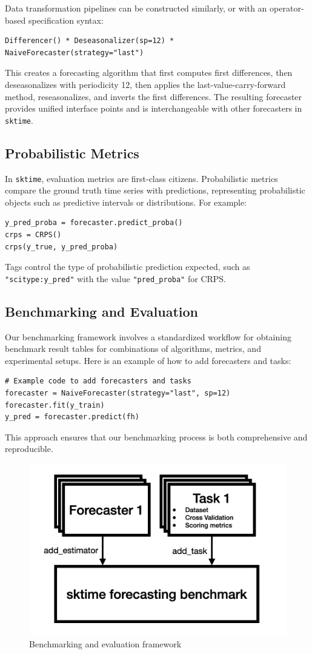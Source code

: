 Data transformation pipelines can be constructed similarly, or with an operator-based specification syntax:

\begin{verbatim}
Differencer() * Deseasonalizer(sp=12) * NaiveForecaster(strategy="last")
\end{verbatim}

This creates a forecasting algorithm that first computes first differences, then deseasonalizes with periodicity 12, then applies the last-value-carry-forward method, reseasonalizes, and inverts the first differences. The resulting forecaster provides unified interface points and is interchangeable with other forecasters in \texttt{sktime}.

\subsection{Probabilistic Metrics}
In \texttt{sktime}, evaluation metrics are first-class citizens. Probabilistic metrics compare the ground truth time series with predictions, representing probabilistic objects such as predictive intervals or distributions. For example:

\begin{verbatim}
y_pred_proba = forecaster.predict_proba()
crps = CRPS()
crps(y_true, y_pred_proba)
\end{verbatim}

Tags control the type of probabilistic prediction expected, such as \texttt{"scitype:y\_pred"} with the value \texttt{"pred\_proba"} for CRPS.

\subsection{Benchmarking and Evaluation}
Our benchmarking framework involves a standardized workflow for obtaining benchmark result tables for combinations of algorithms, metrics, and experimental setups. Here is an example of how to add forecasters and tasks:

\begin{verbatim}
# Example code to add forecasters and tasks
forecaster = NaiveForecaster(strategy="last", sp=12)
forecaster.fit(y_train)
y_pred = forecaster.predict(fh)
\end{verbatim}

This approach ensures that our benchmarking process is both comprehensive and reproducible. 

\begin{figure}
    \centering
    \includegraphics[width=.5\textwidth]{Figures/evaluationFramework.png}
    \caption{Benchmarking and evaluation framework}
    \label{fig:enter-label}
\end{figure}

